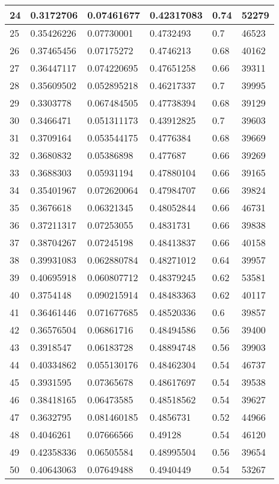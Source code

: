 \begin{longtable}{|l|l|l|l|l|l|}
24 & 0.3172706 & 0.07461677 & 0.42317083 & 0.74 & 52279 \\ \hline 
25 & 0.35426226 & 0.07730001 & 0.4732493 & 0.7 & 46523 \\ \hline 
26 & 0.37465456 & 0.07175272 & 0.4746213 & 0.68 & 40162 \\ \hline 
27 & 0.36447117 & 0.074220695 & 0.47651258 & 0.66 & 39311 \\ \hline 
28 & 0.35609502 & 0.052895218 & 0.46217337 & 0.7 & 39995 \\ \hline 
29 & 0.3303778 & 0.067484505 & 0.47738394 & 0.68 & 39129 \\ \hline 
30 & 0.3466471 & 0.051311173 & 0.43912825 & 0.7 & 39603 \\ \hline 
31 & 0.3709164 & 0.053544175 & 0.4776384 & 0.68 & 39669 \\ \hline 
32 & 0.3680832 & 0.05386898 & 0.477687 & 0.66 & 39269 \\ \hline 
33 & 0.3688303 & 0.05931194 & 0.47880104 & 0.66 & 39165 \\ \hline 
34 & 0.35401967 & 0.072620064 & 0.47984707 & 0.66 & 39824 \\ \hline 
35 & 0.3676618 & 0.06321345 & 0.48052844 & 0.66 & 46731 \\ \hline 
36 & 0.37211317 & 0.07253055 & 0.4831731 & 0.66 & 39838 \\ \hline 
37 & 0.38704267 & 0.07245198 & 0.48413837 & 0.66 & 40158 \\ \hline 
38 & 0.39931083 & 0.062880784 & 0.48271012 & 0.64 & 39957 \\ \hline 
39 & 0.40695918 & 0.060807712 & 0.48379245 & 0.62 & 53581 \\ \hline 
40 & 0.3754148 & 0.090215914 & 0.48483363 & 0.62 & 40117 \\ \hline 
41 & 0.36461446 & 0.071677685 & 0.48520336 & 0.6 & 39857 \\ \hline 
42 & 0.36576504 & 0.06861716 & 0.48494586 & 0.56 & 39400 \\ \hline 
43 & 0.3918547 & 0.06183728 & 0.48894748 & 0.56 & 39903 \\ \hline 
44 & 0.40334862 & 0.055130176 & 0.48462304 & 0.54 & 46737 \\ \hline 
45 & 0.3931595 & 0.07365678 & 0.48617697 & 0.54 & 39538 \\ \hline 
46 & 0.38418165 & 0.06473585 & 0.48518562 & 0.54 & 39627 \\ \hline 
47 & 0.3632795 & 0.081460185 & 0.4856731 & 0.52 & 44966 \\ \hline 
48 & 0.4046261 & 0.07666566 & 0.49128 & 0.54 & 46120 \\ \hline 
49 & 0.42358336 & 0.06505584 & 0.48995504 & 0.56 & 39654 \\ \hline 
50 & 0.40643063 & 0.07649488 & 0.4940449 & 0.54 & 53267 \\ \hline 
\end{longtable}